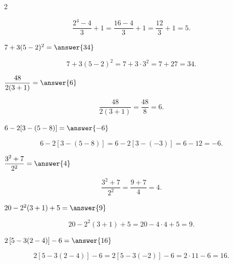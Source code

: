 \documentclass{ximera}
\begin{document}
\begin{oefening}[Rekenvolgorde]{\oefB\ESS}
\begin{multicols}{2}
\begin{question}
    \begin{oplossing}
    \[
    \dfrac{2^4-4}{3}+1
    =\dfrac{16-4}{3}+1
    =\dfrac{12}{3}+1
    =5.
    \]
    \end{oplossing}
    \end{question}
    
    \begin{question}
    $7+3(5-2)^2=\answer{34}$
    
    \begin{oplossing}
    \[
    7+3(5-2)^2
    =7+3\cdot3^2
    =7+27
    =34.
    \]
    \end{oplossing}
    \end{question}
    
    \begin{question}
    $\dfrac{48}{2(3+1)}=\answer{6}$
    
    \begin{oplossing}
    \[
    \dfrac{48}{2(3+1)}
    =\dfrac{48}{8}
    =6.
    \]
    \end{oplossing}
    \end{question}
    
    \begin{question}
    $6-2[3-(5-8)]=\answer{-6}$
    
    \begin{oplossing}
    \[
    6-2[3-(5-8)]
    =6-2[3-(-3)]
    =6-12
    =-6.
    \]
    \end{oplossing}
    \end{question}
    
    \begin{question}
    $\dfrac{3^2+7}{2^2}=\answer{4}$
    
    \begin{oplossing}
    \[
    \dfrac{3^2+7}{2^2}
    =\dfrac{9+7}{4}
    =4.
    \]
    \end{oplossing}
    \end{question}
    
    \begin{question}
    $20-2^2(3+1)+5=\answer{9}$
    
    \begin{oplossing}
    \[
    20-2^2(3+1)+5
    =20-4\cdot4+5
    =9.
    \]
    \end{oplossing}
    \end{question}
    
    \begin{question}
    $2\left[5-3(2-4)\right]-6=\answer{16}$
    
    \begin{oplossing}
    \[
    2\left[5-3(2-4)\right]-6
    =2[5-3(-2)]-6
    =2\cdot11-6
    =16.
    \]
    \end{oplossing}
    \end{question}
    
    \end{multicols}
    
    \end{oefening}
\end{document}
